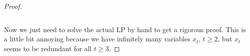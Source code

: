 \documentclass[12pt]{article}
\begin{document}
\begin{proof}
\begin{verbatim}
  \end{verbatim}
  Now we just need to solve the actual LP by hand to get a rigorous proof.  This is a little bit annoying because we have infinitely many variables $x_t$, $t\ge 2$, but $x_t$ seems to be redundant for all $t\ge 3$.
\end{proof}
\end{document}
